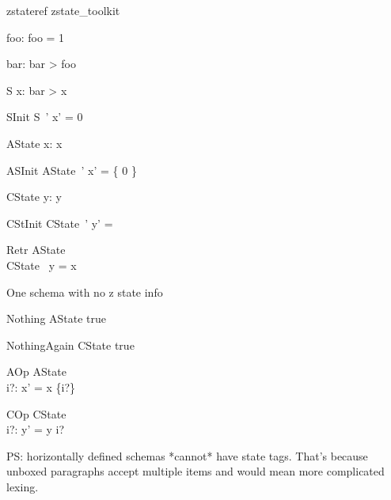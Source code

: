 
\begin{zsection}
   \SECTION zstateref \parents zstate\_toolkit
\end{zsection}

\begin{axdef}
   foo: \nat
\where
   foo = 1
\end{axdef}

\begin{axdef}
   bar: \nat
\where
   bar > foo
\end{axdef}

\zstate
\begin{schema}{S}
   x: \nat
\where
   bar > x
\end{schema}

\zstinit
\begin{schema}{SInit}
   S~'
\where
   x' = 0
\end{schema}

\zastate
\begin{schema}{AState}
   x: \power \nat
\where
  x \neq \emptyset
\end{schema}

\zastinit
\begin{schema}{ASInit}
   AState~'
\where
   x' = \{ 0 \}
\end{schema}

\zcstate
\begin{schema}{CState}
  y: \seq \nat
\where
   y \neq \langle \rangle
\end{schema}

\zcstinit
\begin{schema}{CStInit}
   CState~'
\where
  y' =  \rangle
\end{schema}

\zretrieve
\begin{schema}{Retr}
   AState \\
   CState
\where
   \ran~y = x
\end{schema}

One schema with no z state info
\begin{schema}{Nothing}
   \Delta AState
\where
   true
\end{schema}

\begin{schema}{NothingAgain}
   \Delta CState
\where
   true
\end{schema}

\begin{schema}{AOp}
   \Delta AState \\
   i?: \nat
\where
   x' = x \cup \{i?\}
\end{schema}

\begin{schema}{COp}
   \Delta CState \\
   i?: \nat
\where
   y' = y \cat \langle i? \rangle
\end{schema}

PS: horizontally defined schemas *cannot* have state tags. That's because
unboxed paragraphs accept multiple items and would mean more complicated lexing.